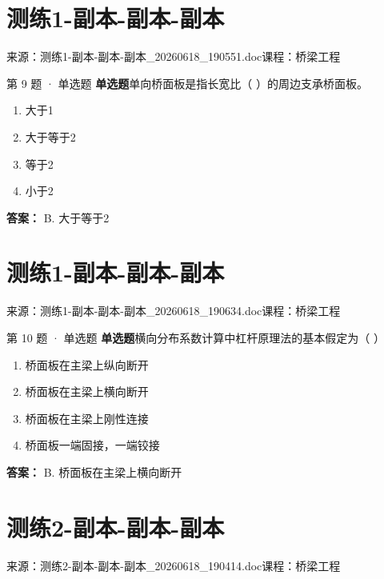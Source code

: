 \documentclass[UTF8,zihao=-4,openany]{ctexbook}
\newenvironment{choices}{\begin{enumerate}[label=\Alph*.,leftmargin=9mm,labelsep=3mm,itemsep=2pt,topsep=4pt]}{\end{enumerate}}
\newcommand{\qtype}[1]{\textcolor{brand}{\sffamily\bfseries #1}}
\newcommand{\sourcefile}[1]{\textcolor{muted}{\small\sffamily 来源：#1}}
\begin{document}
\chapter{测练1-副本-副本-副本}

\sourcefile{测练1-副本-副本-副本\_20260618\_190551.doc}\quad \textcolor{muted}{\small\sffamily 课程：桥梁工程}

\begin{questionbox}{第 9 题 · 单选题}
\qtype{单选题}\quad 单向桥面板是指长宽比（ ）的周边支承桥面板。
\begin{choices}
\item 大于1
\item 大于等于2
\item 等于2
\item 小于2
\end{choices}
\begin{answerbox}
\textbf{答案：} B. 大于等于2
\end{answerbox}
\end{questionbox}

\chapter{测练1-副本-副本-副本}

\sourcefile{测练1-副本-副本-副本\_20260618\_190634.doc}\quad \textcolor{muted}{\small\sffamily 课程：桥梁工程}

\begin{questionbox}{第 10 题 · 单选题}
\qtype{单选题}\quad 横向分布系数计算中杠杆原理法的基本假定为（ ）
\begin{choices}
\item 桥面板在主梁上纵向断开
\item 桥面板在主梁上横向断开
\item 桥面板在主梁上刚性连接
\item 桥面板一端固接，一端铰接
\end{choices}
\begin{answerbox}
\textbf{答案：} B. 桥面板在主梁上横向断开
\end{answerbox}
\end{questionbox}

\chapter{测练2-副本-副本-副本}

\sourcefile{测练2-副本-副本-副本\_20260618\_190414.doc}\quad \textcolor{muted}{\small\sffamily 课程：桥梁工程}
\end{document}
